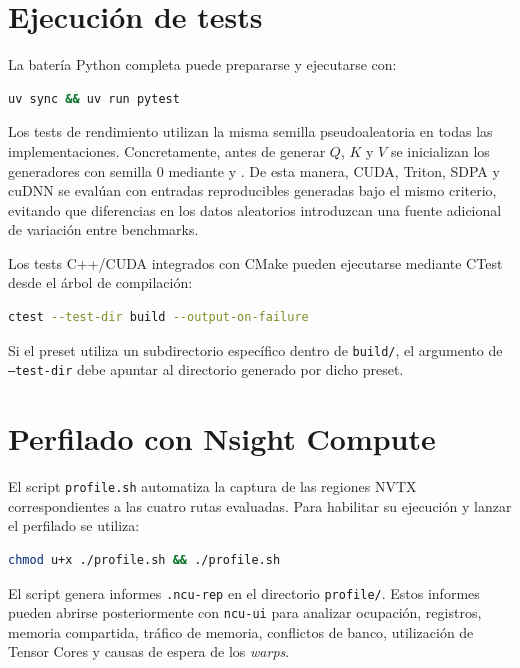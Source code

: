 \section{Ejecución de tests}

La batería Python completa puede prepararse y ejecutarse con:

\begin{lstlisting}[language=bash]
uv sync && uv run pytest
\end{lstlisting}

Los tests de rendimiento utilizan la misma semilla pseudoaleatoria en todas las implementaciones. Concretamente, antes de generar \(Q\), \(K\) y \(V\) se inicializan los generadores con semilla 0 mediante  y . De esta manera, CUDA, Triton, SDPA y cuDNN se evalúan con entradas reproducibles generadas bajo el mismo criterio, evitando que diferencias en los datos aleatorios introduzcan una fuente adicional de variación entre benchmarks.

Los tests C++/CUDA integrados con CMake pueden ejecutarse mediante CTest desde el árbol de compilación:

\begin{lstlisting}[language=bash]
ctest --test-dir build --output-on-failure
\end{lstlisting}

Si el preset utiliza un subdirectorio específico dentro de \texttt{build/}, el argumento de \texttt{--test-dir} debe apuntar al directorio generado por dicho preset.

\section{Perfilado con Nsight Compute}

El script \texttt{profile.sh} automatiza la captura de las regiones NVTX correspondientes a las cuatro rutas evaluadas. Para habilitar su ejecución y lanzar el perfilado se utiliza:

\begin{lstlisting}[language=bash]
chmod u+x ./profile.sh && ./profile.sh
\end{lstlisting}

El script genera informes \texttt{.ncu-rep} en el directorio \texttt{profile/}. Estos informes pueden abrirse posteriormente con \texttt{ncu-ui} para analizar ocupación, registros, memoria compartida, tráfico de memoria, conflictos de banco, utilización de Tensor Cores y causas de espera de los \textit{warps}.

